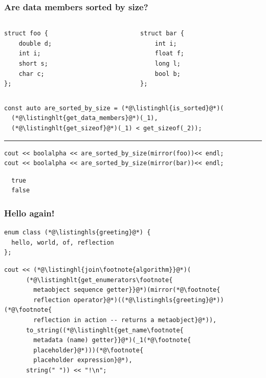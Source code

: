 \documentclass[aspectratio=169,compress,table,xcolor=table]{beamer}
\begin{document}
\begin{frame}[fragile]
  \frametitle{Are data members sorted by size?}
  \begin{columns}
    \begin{column}{.45\textwidth}
      \begin{lstlisting}[language=c++2x,basicstyle=\small\ttfamily]
struct foo {
    double d;
    int i;
    short s;
    char c;
};
      \end{lstlisting}
    \end{column}
    \begin{column}{.45\textwidth}
      \begin{lstlisting}[language=c++2x,basicstyle=\small\ttfamily]
struct bar {
    int i;
    float f;
    long l;
    bool b;
};
      \end{lstlisting}
    \end{column}
  \end{columns}
  \begin{lstlisting}[language=c++2x,basicstyle=\small\ttfamily]
const auto are_sorted_by_size = (*@\listinghl{is_sorted}@*)(
  (*@\listinghlt{get_data_members}@*)(_1),
  (*@\listinghlt{get_sizeof}@*)(_1) < get_sizeof(_2));
  \end{lstlisting}
  \hrule
  \begin{lstlisting}[language=c++2x,basicstyle=\small\ttfamily]
cout << boolalpha << are_sorted_by_size(mirror(foo))<< endl;
cout << boolalpha << are_sorted_by_size(mirror(bar))<< endl;
  \end{lstlisting}
  \begin{verbatim}
  true
  false
  \end{verbatim}
\end{frame}
\begin{frame}[fragile]
  \frametitle{Hello again!}
  \begin{lstlisting}[language=c++2x,basicstyle=\normalsize\ttfamily]
enum class (*@\listinghls{greeting}@*) {
  hello, world, of, reflection
};
  \end{lstlisting}
  \begin{lstlisting}[language=c++2x,basicstyle=\normalsize\ttfamily]
cout << (*@\listinghl{join\footnote{algorithm}}@*)(
      (*@\listinghlt{get_enumerators\footnote{
        metaobject sequence getter}}@*)(mirror(*@\footnote{
        reflection operator}@*)((*@\listinghls{greeting}@*))(*@\footnote{
        reflection in action -- returns a metaobject}@*)),
      to_string((*@\listinghlt{get_name\footnote{
        metadata (name) getter}}@*)(_1(*@\footnote{
        placeholder}@*)))(*@\footnote{
        placeholder expression}@*),
      string(" ")) << "!\n";
  \end{lstlisting}
\end{frame}
\end{document}
